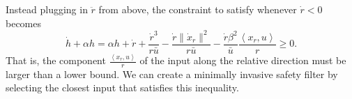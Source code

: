 \documentclass[letterpaper, 12pt]{article}
\begin{document}
Instead plugging in $\ddot r$ from above, the constraint to satisfy whenever $\dot r < 0$ becomes
\begin{equation}
	\dot h + \alpha h = \alpha h + \dot r + \frac{\dot r^3}{r \bar u} - \frac{\dot r \| \dot x_r\|^2}{r \bar u} - \frac{\dot r \beta^2}{\bar u} \frac{\left\langle x_r, u \right\rangle}{r} \geq 0.
\end{equation}
That is, the component $\frac{\left\langle x_r, u \right\rangle}{r}$ of the input along the relative direction must be larger than a lower bound. We can create a minimally invasive safety filter by selecting the closest input that satisfies this inequality.
\end{document}
